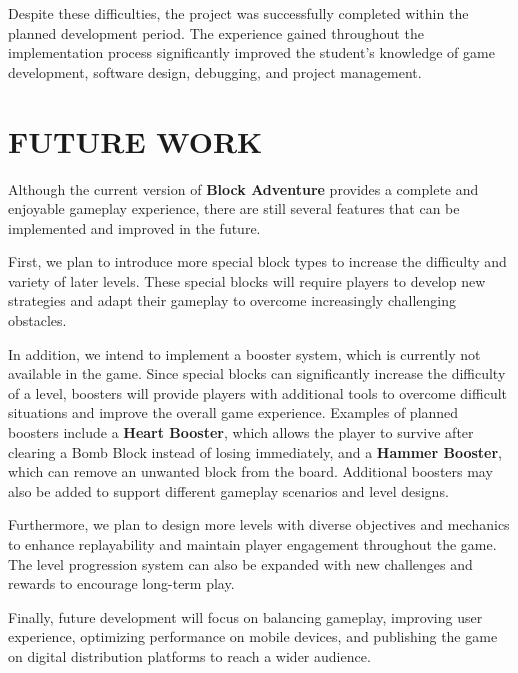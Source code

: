 \documentclass[a4paper,12pt]{report}
\begin{document}
Despite these difficulties, the project was successfully completed within the planned development period. The experience gained throughout the implementation process significantly improved the student's knowledge of game development, software design, debugging, and project management.

\chapter{FUTURE WORK}
Although the current version of \textbf{Block Adventure} provides a complete and enjoyable gameplay experience, there are still several features that can be implemented and improved in the future.

First, we plan to introduce more special block types to increase the difficulty and variety of later levels. These special blocks will require players to develop new strategies and adapt their gameplay to overcome increasingly challenging obstacles.

In addition, we intend to implement a booster system, which is currently not available in the game. Since special blocks can significantly increase the difficulty of a level, boosters will provide players with additional tools to overcome difficult situations and improve the overall game experience. Examples of planned boosters include a \textbf{Heart Booster}, which allows the player to survive after clearing a Bomb Block instead of losing immediately, and a \textbf{Hammer Booster}, which can remove an unwanted block from the board. Additional boosters may also be added to support different gameplay scenarios and level designs.

Furthermore, we plan to design more levels with diverse objectives and mechanics to enhance replayability and maintain player engagement throughout the game. The level progression system can also be expanded with new challenges and rewards to encourage long-term play.

Finally, future development will focus on balancing gameplay, improving user experience, optimizing performance on mobile devices, and publishing the game on digital distribution platforms to reach a wider audience.
\end{document}
